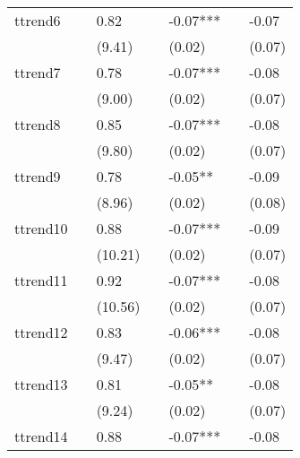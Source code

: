 \begin{table}
\begin{center}
\begin{tabular}{lllllll}
ttrend6                     &              & 0.82         &              & -0.07***     &              & -0.07         \\
                            &              & (9.41)       &              & (0.02)       &              & (0.07)        \\
ttrend7                     &              & 0.78         &              & -0.07***     &              & -0.08         \\
                            &              & (9.00)       &              & (0.02)       &              & (0.07)        \\
ttrend8                     &              & 0.85         &              & -0.07***     &              & -0.08         \\
                            &              & (9.80)       &              & (0.02)       &              & (0.07)        \\
ttrend9                     &              & 0.78         &              & -0.05**      &              & -0.09         \\
                            &              & (8.96)       &              & (0.02)       &              & (0.08)        \\
ttrend10                    &              & 0.88         &              & -0.07***     &              & -0.09         \\
                            &              & (10.21)      &              & (0.02)       &              & (0.07)        \\
ttrend11                    &              & 0.92         &              & -0.07***     &              & -0.08         \\
                            &              & (10.56)      &              & (0.02)       &              & (0.07)        \\
ttrend12                    &              & 0.83         &              & -0.06***     &              & -0.08         \\
                            &              & (9.47)       &              & (0.02)       &              & (0.07)        \\
ttrend13                    &              & 0.81         &              & -0.05**      &              & -0.08         \\
                            &              & (9.24)       &              & (0.02)       &              & (0.07)        \\
ttrend14                    &              & 0.88         &              & -0.07***     &              & -0.08         \\

\end{tabular}
\end{center}
\end{table}
